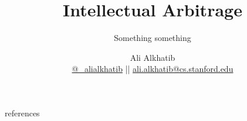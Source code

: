 \documentclass[aspectratio=169,12pt]{beamer} %
\title{Intellectual Arbitrage}
\subtitle{Something something}
\author{{Ali Alkhatib}\\
\href{http://twitter.com/_alialkhatib}{@\_alialkhatib} || \href{mailto:ali.alkhatib@cs.stanford.edu}{ali.alkhatib@cs.stanford.edu}}
\institute[Stanford]{{\normalsize Stanford HCI Group}}
\date{}
\newcommand{\onlyinsubfile}[1]{#1}
\newcommand{\notinsubfile}[1]{}
\begin{document}
\renewcommand{\onlyinsubfile}[1]{}
\renewcommand{\notinsubfile}[1]{#1}

\begin{frame}
\titlepage
\end{frame} 


\def\stackalignment{l}
\def\stacktype{S}









% 






\begin{frame}[allowframebreaks]{references}
  \printbibliography{}
\end{frame}
\end{document}
